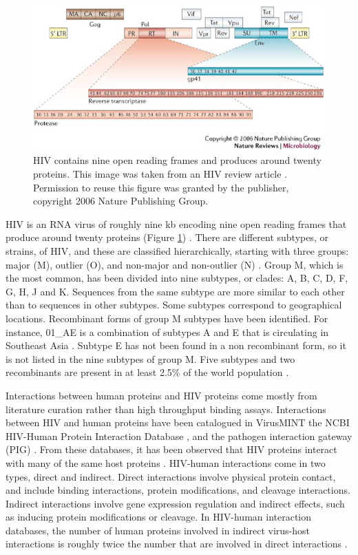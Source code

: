 \begin{figure}
\begin{center}
\includegraphics[scale=0.75]{figs/hiv_proteins}
\end{center}
\caption[HIV genome]{\small HIV contains nine open reading frames and
  produces around twenty proteins. This image was taken from an HIV
  review article \cite{lengauer2006bioinformatics}. Permission to
  reuse this figure was granted by the publisher, copyright 2006
  Nature Publishing Group. \label{fig:hiv_proteins}}
\end{figure}

HIV is an RNA virus of roughly nine kb encoding nine open reading
frames that produce around twenty proteins (Figure
\ref{fig:hiv_proteins}) \cite{frankel2003hiv}. There are different
subtypes, or strains, of HIV, and these are classified hierarchically,
starting with three groups: major (M), outlier (O), and non-major and
non-outlier (N) \cite{taylor08}. Group M, which is the most common,
has been divided into nine subtypes, or clades: A, B, C, D, F, G, H, J
and K. Sequences from the same subtype are more similar to each other
than to sequences in other subtypes. Some subtypes correspond to
geographical locations. Recombinant forms of group M subtypes have
been identified. For instance, 01\_AE is a combination of subtypes A
and E that is circulating in Southeast Asia \cite{taylor08}. Subtype E
has not been found in a non recombinant form, so it is not listed in
the nine subtypes of group M. Five subtypes and two recombinants are
present in at least 2.5\% of the world population \cite{taylor08}.

Interactions between human proteins and HIV proteins come mostly from
literature curation rather than high throughput binding
assays. Interactions between HIV and human proteins have been
catalogued in VirusMINT \cite{chatr08} the NCBI HIV-Human Protein
Interaction Database \cite{ptak08}, and the pathogen interaction
gateway (PIG) \cite{driscoll2009pig}. From these databases, it has
been observed that HIV proteins interact with many of the same host
proteins \cite{fu09}. HIV-human interactions come in two types, direct
and indirect. Direct interactions involve physical protein contact,
and include binding interactions, protein modifications, and cleavage
interactions. Indirect interactions involve gene expression regulation
and indirect effects, such as inducing protein modifications or
cleavage. In HIV-human interaction databases, the number of human
proteins involved in indirect virus-host interactions is roughly twice
the number that are involved in direct interactions \cite{fu09}.

